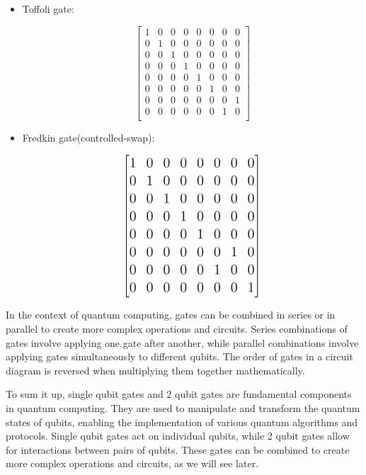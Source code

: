 \documentclass[inscr,ack,preface]{diphdthesis}
\begin{document}
\begin{itemize}
\item Toffoli gate:
    \begin{center}
    \Large
\[\begin{bmatrix}
        1 & 0 & 0 & 0 & 0 & 0 & 0 & 0 \\
        0 & 1 & 0 & 0 & 0 & 0 & 0 & 0 \\
        0 & 0 & 1 & 0 & 0 & 0 & 0 & 0 \\
        0 & 0 & 0 & 1 & 0 & 0 & 0 & 0 \\
        0 & 0 & 0 & 0 & 1 & 0 & 0 & 0 \\
        0 & 0 & 0 & 0 & 0 & 1 & 0 & 0 \\
        0 & 0 & 0 & 0 & 0 & 0 & 0 & 1 \\
        0 & 0 & 0 & 0 & 0 & 0 & 1 & 0 \\
    \end{bmatrix}\]    
    \normalsize
    \end{center}
    \item Fredkin gate(controlled-swap):
    \begin{center}

\[    \Large\begin{bmatrix}
        1 & 0 & 0 & 0 & 0 & 0 & 0 & 0 \\
        0 & 1 & 0 & 0 & 0 & 0 & 0 & 0 \\
        0 & 0 & 1 & 0 & 0 & 0 & 0 & 0 \\
        0 & 0 & 0 & 1 & 0 & 0 & 0 & 0 \\
        0 & 0 & 0 & 0 & 1 & 0 & 0 & 0 \\
        0 & 0 & 0 & 0 & 0 & 0 & 1 & 0 \\
        0 & 0 & 0 & 0 & 0 & 1 & 0 & 0 \\
        0 & 0 & 0 & 0 & 0 & 0 & 0 & 1 \\
    \end{bmatrix}\]    
\normalsize
\end{center}
\end{itemize}

In the context of quantum computing, gates can be combined in series or in parallel to create more complex operations and circuits. Series combinations of gates involve applying one gate after another, while parallel combinations involve applying gates simultaneously to different \acrshort{qubit}s. The order of gates in a circuit diagram is reversed when multiplying them together mathematically.

To sum it up, single \acrshort{qubit} gates and 2 \acrshort{qubit} gates are fundamental components in quantum computing. They are used to manipulate and transform the quantum states of \acrshort{qubit}s, enabling the implementation of various quantum algorithms and protocols. Single \acrshort{qubit} gates act on individual \acrshort{qubit}s, while 2 \acrshort{qubit} gates allow for interactions between pairs of \acrshort{qubit}s. These gates can be combined to create more complex operations and circuits, as we will see later. 
\end{document}
